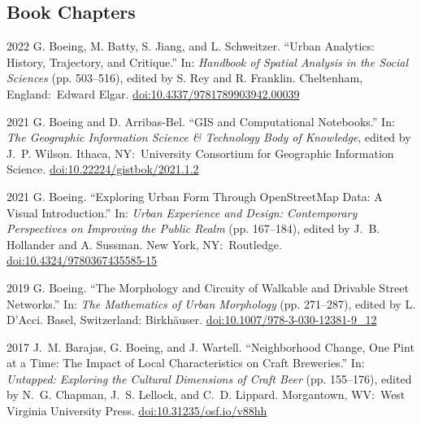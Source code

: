 \documentclass[11pt,letterpaper]{report} %
\begin{document}
    \subsection*{Book Chapters}

    \begin{tablist}

        \item[2022] \tab{}G. Boeing, M. Batty, S. Jiang, and L. Schweitzer. \enquote{Urban Analytics: History, Trajectory, and Critique.} In: \textit{Handbook of Spatial Analysis in the Social Sciences} (pp. 503--516), edited by S. Rey and R. Franklin. Cheltenham, England:\ Edward Elgar. \href{https://doi.org/10.4337/9781789903942.00039}{doi:10.4337/9781789903942.00039}

        \item[2021] \tab{}G. Boeing and D. Arribas-Bel. \enquote{GIS and Computational Notebooks.} In: \textit{The Geographic Information Science \& Technology Body of Knowledge}, edited by J.~P. Wilson. Ithaca, NY:\ University Consortium for Geographic Information Science. \href{https://doi.org/10.22224/gistbok/2021.1.2}{doi:10.22224/gistbok/2021.1.2}

        \item[2021] \tab{}G. Boeing. \enquote{Exploring Urban Form Through OpenStreetMap Data: A Visual Introduction.} In: \textit{Urban Experience and Design: Contemporary Perspectives on Improving the Public Realm} (pp. 167--184), edited by J.~B. Hollander and A. Sussman. New York, NY:\ Routledge. \href{https://doi.org/10.4324/9780367435585-15}{doi:10.4324/9780367435585-15}

        \item[2019] \tab{}G. Boeing. \enquote{The Morphology and Circuity of Walkable and Drivable Street Networks.} In: \textit{The Mathematics of Urban Morphology} (pp. 271--287), edited by L. D'Acci. Basel, Switzerland: Birkh{\"a}user. \href{https://doi.org/10.1007/978-3-030-12381-9_12}{doi:10.1007/978-3-030-12381-9\_12}

        \item[2017] \tab{}J.~M. Barajas, G. Boeing, and J. Wartell. \enquote{Neighborhood Change, One Pint at a Time: The Impact of Local Characteristics on Craft Breweries.} In: \textit{Untapped: Exploring the Cultural Dimensions of Craft Beer} (pp. 155--176), edited by N.~G. Chapman, J.~S. Lellock, and C.~D. Lippard. Morgantown, WV:\ West Virginia University Press. \href{https://doi.org/10.31235/osf.io/v88hh}{doi:10.31235/osf.io/v88hh}

    \end{tablist}
\end{document}
